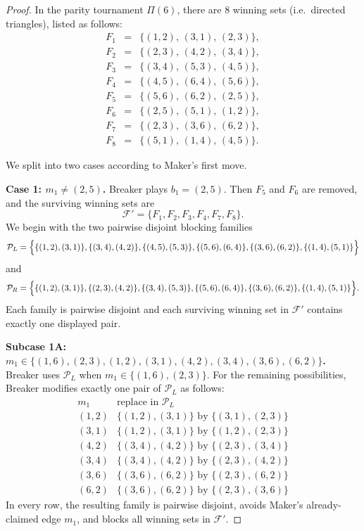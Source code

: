\documentclass{article}
\theoremstyle{definition}
\theoremstyle{plain}
\theoremstyle{remark}
\theoremstyle{definition}
\begin{document}
\begin{proof}
In the parity tournament $\Pi(6)$, there are $8$ winning sets (i.e.\ directed triangles), listed as follows:
\[
\begin{array}{rcl}
F_1 &=& \{(1,2),\,(3,1),\,(2,3)\},\\[1mm]
F_2 &=& \{(2,3),\,(4,2),\,(3,4)\},\\[1mm]
F_3 &=& \{(3,4),\,(5,3),\,(4,5)\},\\[1mm]
F_4 &=& \{(4,5),\,(6,4),\,(5,6)\},\\[1mm]
F_5 &=& \{(5,6),\,(6,2),\,(2,5)\},\\[1mm]
F_6 &=& \{(2,5),\,(5,1),\,(1,2)\},\\[1mm]
F_7 &=& \{(2,3),\,(3,6),\,(6,2)\},\\[1mm]
F_8 &=& \{(5,1),\,(1,4),\,(4,5)\}.
\end{array}
\]

We split into two cases according to Maker's first move.

\medskip
\noindent\textbf{Case 1: $m_1\neq (2,5)$.}
Breaker plays $b_1=(2,5)$. Then $F_5$ and $F_6$ are removed, and the surviving winning sets are
\[
\mathcal F'=\{F_1,F_2,F_3,F_4,F_7,F_8\}.
\]
We begin with the two pairwise disjoint blocking families
\[
\mathcal P_L=
\Bigl\{
\{(1,2),(3,1)\},
\{(3,4),(4,2)\},
\{(4,5),(5,3)\},
\{(5,6),(6,4)\},
\{(3,6),(6,2)\},
\{(1,4),(5,1)\}
\Bigr\}
\]
and
\[
\mathcal P_R=
\Bigl\{
\{(1,2),(3,1)\},
\{(2,3),(4,2)\},
\{(3,4),(5,3)\},
\{(5,6),(6,4)\},
\{(3,6),(6,2)\},
\{(1,4),(5,1)\}
\Bigr\}.
\]
Each family is pairwise disjoint and each surviving winning set in $\mathcal F'$ contains exactly one displayed pair.

\smallskip
\noindent\textbf{Subcase 1A: $m_1\in\{(1,6),(2,3),(1,2),(3,1),(4,2),(3,4),(3,6),(6,2)\}$.}
Breaker uses $\mathcal P_L$ when $m_1\in\{(1,6),(2,3)\}$. For the remaining possibilities, Breaker modifies exactly one pair of $\mathcal P_L$ as follows:
\[
\begin{array}{c|c}
m_1 & \text{replace in }\mathcal P_L \\ \hline
(1,2) & \{(1,2),(3,1)\}\text{ by }\{(3,1),(2,3)\}\\[1mm]
(3,1) & \{(1,2),(3,1)\}\text{ by }\{(1,2),(2,3)\}\\[1mm]
(4,2) & \{(3,4),(4,2)\}\text{ by }\{(2,3),(3,4)\}\\[1mm]
(3,4) & \{(3,4),(4,2)\}\text{ by }\{(2,3),(4,2)\}\\[1mm]
(3,6) & \{(3,6),(6,2)\}\text{ by }\{(2,3),(6,2)\}\\[1mm]
(6,2) & \{(3,6),(6,2)\}\text{ by }\{(2,3),(3,6)\}
\end{array}
\]
In every row, the resulting family is pairwise disjoint, avoids Maker's already-claimed edge $m_1$, and blocks all winning sets in $\mathcal F'$.


\end{proof}
\end{document}
